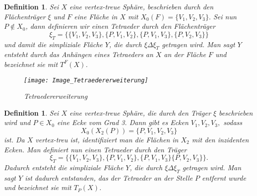 \documentclass[12pt,titlepage,twoside,cleardoublepage]{article}
\theoremstyle{nummermitklammern}
\newtheorem{definition}[temp]{Definition}
\newtheorem{definition}[zahl]{Definition}
\numberwithin{equation}{section}
\begin{document}
\begin{definition}
Sei $X$ eine vertex-treue Sphäre, beschrieben durch den Flächenträger $\xi$ und $F$ eine Fläche in $X$ mit $X_0(F)=\{V_1,V_2,V_3\}.$ Sei nun $P\notin X_0$, dann definieren wir einen Tetraeder durch den Flächenträger
\[
\xi_T=\{\{V_1,V_2,V_3\},\{P,V_1,V_2\},\{P,V_1,V_3\},\{P,V_2,V_3\}\}
\] 
und damit die simpliziale Fläche $Y$, die durch $\xi \Delta \xi_T$ getragen wird. Man sagt $Y$ entsteht durch das Anhängen eines Tetraeders an $X$ an der Fläche $F$ und bezeichnet sie mit $T^F(X)$.
\begin{figure}[H]
\begin{center}
\texttt{[image: Image\_Tetraedererweiterung]}
\end{center}
\caption{Tetraedererweiterung}
\end{figure}

\end{definition}

\begin{definition}
Sei $X$ eine vertex-treue Sphäre, die durch den Träger $\xi$ beschrieben wird und $P\in X_0$ eine Ecke vom Grad 3. Dann gibt es Ecken $V_1,V_2,V_3,$ sodass
\[
X_0(X_2(P))=\{P,V_1,V_2,V_3\}
\] 
ist. Da $X$ vertex-treu ist, identifiziert man die Flächen in $X_2$  mit den inzidenten Ecken.  Man definiert nun einen Tetraeder durch den Träger 
\[
\xi_T=\{\{V_1,V_2,V_3\},\{P,V_1,V_2\},\{P,V_1,V_3\}\{P,V_2,V_3\}\}.
\]  Dadurch entsteht die simpliziale Fläche $Y$, die durch $\xi \Delta \xi_T$ getragen wird. Man sagt $Y$ ist dadurch entstanden, das der Tetraeder an der Stelle $P$ entfernt wurde und bezeichnet sie mit $T_P(X)$.
\end{definition}
\end{document}
